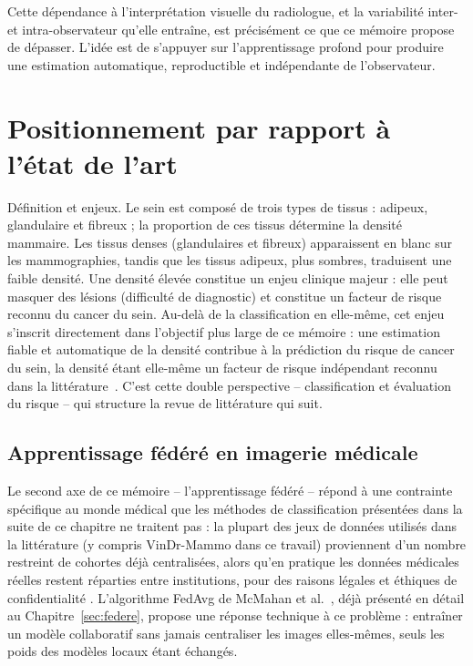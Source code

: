 \documentclass[12pt,a4paper]{report}
\begin{document}
Cette dépendance à l'interprétation visuelle du radiologue, et la
variabilité inter- et intra-observateur qu'elle entraîne, est précisément ce
que ce mémoire propose de dépasser. L'idée est de s'appuyer sur
l'apprentissage profond pour produire une estimation automatique,
reproductible et indépendante de l'observateur.

\chapter{Positionnement par rapport à l'état de l'art}
\label{sec:etat-art-positionnement}

Définition et enjeux. Le sein est composé de trois types de tissus :
adipeux, glandulaire et fibreux ; la proportion de ces tissus détermine la
densité mammaire. Les tissus denses (glandulaires et fibreux) apparaissent
en blanc sur les mammographies, tandis que les tissus adipeux, plus
sombres, traduisent une faible densité. Une densité élevée constitue un
enjeu clinique majeur : elle peut masquer des lésions (difficulté de
diagnostic) et constitue un facteur de risque reconnu du cancer du sein.
Au-delà de la classification en elle-même, cet enjeu s'inscrit directement
dans l'objectif plus large de ce mémoire : une estimation fiable et
automatique de la densité contribue à la prédiction du risque de cancer du
sein, la densité étant elle-même un facteur de risque indépendant reconnu
dans la littérature~\cite{ref2, ref4}. C'est cette double perspective --
classification et évaluation du risque -- qui structure la revue de
littérature qui suit.

\section{Apprentissage fédéré en imagerie médicale}
\label{sec:etat-art-federe}

Le second axe de ce mémoire -- l'apprentissage fédéré -- répond à une
contrainte spécifique au monde médical que les méthodes de classification
présentées dans la suite de ce chapitre ne traitent pas : la plupart des
jeux de données utilisés dans la littérature (y compris VinDr-Mammo dans ce
travail) proviennent d'un nombre restreint de cohortes déjà centralisées,
alors qu'en pratique les données médicales réelles restent réparties entre
institutions, pour des raisons légales et éthiques de confidentialité
\cite{ref_rieke_fl_digital_health}. L'algorithme FedAvg de McMahan et al.\
\cite{ref_fedavg}, déjà présenté en détail au Chapitre~\ref{sec:federe},
propose une réponse technique à ce problème : entraîner un modèle
collaboratif sans jamais centraliser les images elles-mêmes, seuls les
poids des modèles locaux étant échangés.
\end{document}
